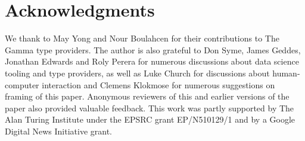 \documentclass[conference]{IEEEtran}
\begin{document}
\section*{Acknowledgments}

We thank to May Yong and Nour Boulahcen for their contributions to The Gamma type providers.
The author is also grateful to Don Syme, James Geddes, Jonathan Edwards and Roly Perera for
numerous discussions about data science tooling and type providers, as well as Luke Church for
discussions about human-computer interaction and Clemens Klokmose for numerous suggestions on
framing of this paper. Anonymous reviewers of this and earlier versions of the paper also provided
valuable feedback. This work was partly supported by The Alan Turing Institute under the EPSRC
grant EP/N510129/1 and by a Google Digital News Initiative grant.



\end{document}
